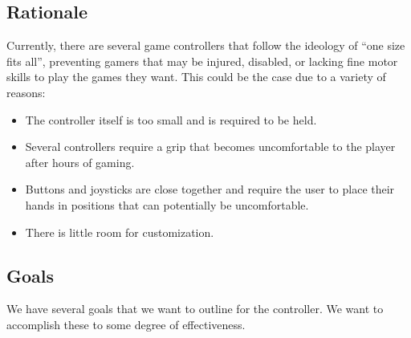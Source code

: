 \documentclass[a4]{article}
\begin{document}
\subsection{Rationale}
Currently, there are several game controllers that follow the ideology of “one size fits all”, preventing gamers that may be injured, disabled, or lacking fine motor
skills to play the games they want. This could be the case due to a variety of reasons:
\begin{itemize}
	\item The controller itself is too small and is required to be held.
	\item Several controllers require a grip that becomes uncomfortable to the player after hours of gaming.
	\item Buttons and joysticks are close together and require the user to place their hands in positions that can potentially be uncomfortable.
	\item There is little room for customization.
\end{itemize}

\subsection{Goals}
We have several goals that we want to outline for the controller. We want to accomplish these to some degree of effectiveness.
\end{document}
